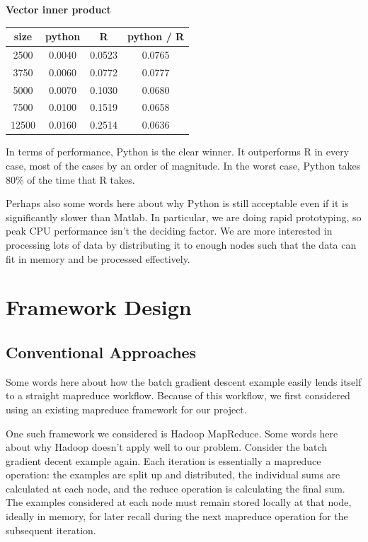 \documentclass[%
        final,
        notitlepage,
        narroweqnarray,
        inline,
        ]{ieee}
\begin{document}
\begin{center}
\vspace{1em}
\textbf{Vector inner product} \\
\begin{tabular}{cccc}
size  & python  &  R       & python / R \\
  \hline
2500  & 0.0040 & 0.0523 & 0.0765 \\
3750  & 0.0060 & 0.0772 & 0.0777 \\
5000  & 0.0070 & 0.1030 & 0.0680 \\
7500  & 0.0100 & 0.1519 & 0.0658 \\
12500 & 0.0160 & 0.2514 & 0.0636 \\
\end{tabular}

\end{center}

In terms of performance, Python is the clear winner. It outperforms R in every case, most of the cases by an order of magnitude. In the worst case, Python takes 80\% of the time that R takes.

Perhaps also some words here about why Python is still acceptable even if it is
significantly slower than Matlab. In particular, we are doing rapid
prototyping, so peak CPU performance isn't the deciding factor. We are more
interested in processing lots of data by distributing it to enough nodes such
that the data can fit in memory and be processed effectively.

\section{Framework Design}

\subsection{Conventional Approaches}

Some words here about how the batch gradient descent example easily lends
itself to a straight mapreduce workflow. Because of this workflow, we first
considered using an existing mapreduce framework for our project.

One such framework we considered is Hadoop MapReduce. Some words here about why
Hadoop doesn't apply well to our problem. Consider the batch gradient decent
example again. Each iteration is essentially a mapreduce operation: the
examples are split up and distributed, the individual sums are calculated at
each node, and the reduce operation is calculating the final sum. The examples
considered at each node must remain stored locally at that node, ideally in
memory, for later recall during the next mapreduce operation for the subsequent
iteration.
\end{document}
